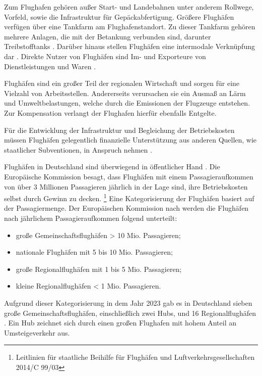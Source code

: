 Zum Flughafen gehören außer Start- und Landebahnen unter anderem 
Rollwege, Vorfeld, sowie die Infrastruktur für Gepäckabfertigung. 
Größere Flughäfen verfügen über eine Tankfarm am Flughafenstandort. 
Zu dieser Tankfarm gehören mehrere Anlagen, die mit der Betankung verbunden sind, darunter Treibstofftanks \cite{moriarty2024sustainable}.
Darüber hinaus stellen Flughäfen eine intermodale Verknüpfung dar \cite{conrady2019luftverkehr}. %
Direkte Nutzer von Flughäfen sind Im- und Exporteure von Dienstleistungen und Waren \cite{schaar2010analysis}. 

Flughäfen sind ein großer Teil der regionalen Wirtschaft \cite{schaar2010analysis} 
und sorgen für eine Vielzahl von Arbeitsstellen. 
Andererseits verursachen sie ein Ausmaß an Lärm und Umweltbelastungen, 
welche durch die Emissionen der Flugzeuge entstehen.
Zur Kompensation verlangt der Flughafen hierfür ebenfalls Entgelte. %

Für die Entwicklung der Infrastruktur und Begleichung der Betriebskosten müssen Flughäfen 
gelegentlich finanzielle Unterstützung aus anderen Quellen, wie staatlicher Subventionen, 
in Anspruch nehmen \cite{schaar2010analysis}. 

Flughäfen in Deutschland sind überwiegend in öffentlicher Hand \cite{conrady2019luftverkehr}.
Die Europäische Kommission besagt, dass Flughäfen mit einem Passagieraufkommen von über 3 Millionen 
Passagieren jährlich in der Lage sind, ihre Betriebskosten selbst durch Gewinn zu decken.
\footnote{\glqq Leitlinien für staatliche Beihilfe für Flughäfen und Luftverkehrsgesellschaften\grqq{} 2014/C 99/03}
Eine Kategorisierung der Flughäfen basiert auf der Passagiermenge. 
Der Europäischen Kommission nach werden die Flughäfen nach jährlichem Passagieraufkommen folgend unterteilt: 
\begin{itemize}
    \item große Gemeinschaftsflughäfen > 10 Mio. Passagieren;
    \item nationale Flughäfen mit 5 bis 10 Mio. Passagieren;
    \item große Regionalflughäfen mit 1 bis 5 Mio. Passagieren;
    \item kleine Regionalflughäfen < 1 Mio. Passagieren.
\end{itemize}
Aufgrund dieser Kategorisierung in dem Jahr 2023 gab es in Deutschland 
sieben große Gemeinschaftsflughäfen, einschließlich zwei Hubs, und 16 Regionalflughäfen \cite{Destatis_Luftverkehr_2024}.
Ein Hub zeichnet sich durch einen großen Flughafen mit hohem Anteil an Umsteigeverkehr aus.

